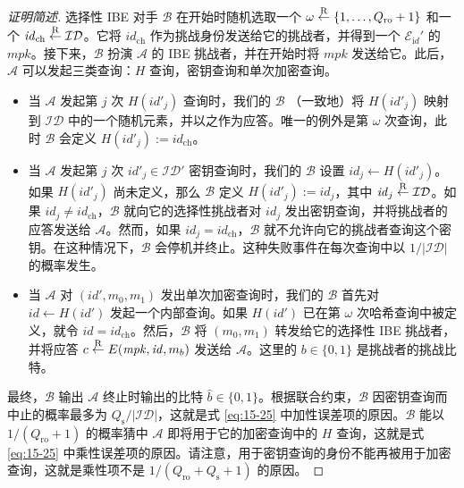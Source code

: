 \begin{proof}[证明简述]
选择性 IBE 对手 $\mathcal{B}$ 在开始时随机选取一个 $\omega\overset{\rm R}\leftarrow\{1,\dots,Q_\mathrm{ro}+1\}$ 和一个 $\mathit{id}_\mathrm{ch}\overset{\rm R}\leftarrow\mathcal{ID}$。它将 $\mathit{id}_\mathrm{ch}$ 作为挑战身份发送给它的挑战者，并得到一个 $\mathcal{E}_{\mathrm{i}d}'$ 的 $\mathit{mpk}$。接下来，$\mathcal{B}$ 扮演 $\mathcal{A}$ 的 IBE 挑战者，并在开始时将 $\mathit{mpk}$ 发送给它。此后，$\mathcal{A}$ 可以发起三类查询：$H$ 查询，密钥查询和单次加密查询。
\begin{itemize}
	\item 当 $\mathcal{A}$ 发起第 $j$ 次 $H(\mathit{id'}_j)$ 查询时，我们的 $\mathcal{B}$ （一致地）将 $H(\mathit{id'}_j)$ 映射到 $\mathcal{ID}$ 中的一个随机元素，并以之作为应答。唯一的例外是第 $\omega$ 次查询，此时 $\mathcal{B}$ 会定义 $H(\mathit{id'}_j):=\mathit{id}_\mathrm{ch}$。
	\item 当 $\mathcal{A}$ 发起第 $j$ 次 $\mathit{id'}_j\in\mathcal{ID}'$ 密钥查询时，我们的 $\mathcal{B}$ 设置 $\mathit{id}_j\leftarrow H(\mathit{id'}_j)$。如果 $H(\mathit{id'}_j)$ 尚未定义，那么 $\mathcal{B}$ 定义 $H(\mathit{id'}_j):=\mathit{id}_j$，其中 $\mathit{id}_j\overset{\rm R}\leftarrow\mathcal{ID}$。如果 $\mathit{id}_j\neq\mathit{id}_\mathrm{ch}$，$\mathcal{B}$ 就向它的选择性挑战者对 $\mathit{id}_j$ 发出密钥查询，并将挑战者的应答发送给 $\mathcal{A}$。然而，如果 $\mathit{id}_j=\mathit{id}_\mathrm{ch}$，$\mathcal{B}$ 就不允许向它的挑战者查询这个密钥。在这种情况下，$\mathcal{B}$ 会停机并终止。这种失败事件在每次查询中以 $1/|\mathcal{ID}|$ 的概率发生。
	\item 当 $\mathcal{A}$ 对 $(\mathit{id'},m_0,m_1)$ 发出单次加密查询时，我们的 $\mathcal{B}$ 首先对 $\mathit{id}\leftarrow H(\mathit{id'})$ 发起一个内部查询。如果 $H(\mathit{id'})$ 已在第 $\omega$ 次哈希查询中被定义，就令 $\mathit{id}=\mathit{id}_\mathrm{ch}$。然后，$\mathcal{B}$ 将 $(m_0,m_1)$ 转发给它的选择性 IBE 挑战者，并将应答 $c\overset{\rm R}\leftarrow E(\mathit{mpk},\mathit{id},m_b)$ 发送给 $\mathcal{A}$。这里的 $b\in\{0,1\}$ 是挑战者的挑战比特。
\end{itemize}
最终，$\mathcal{B}$ 输出 $\mathcal{A}$ 终止时输出的比特 $\hat{b}\in\{0,1\}$。根据联合约束，$\mathcal{B}$ 因密钥查询而中止的概率最多为 $Q_\mathrm{s}/|\mathcal{ID}|$，这就是式 \ref{eq:15-25} 中加性误差项的原因。$\mathcal{B}$ 能以 $1/(Q_\mathrm{ro}+1)$ 的概率猜中 $\mathcal{A}$ 即将用于它的加密查询中的 $H$ 查询，这就是式 \ref{eq:15-25} 中乘性误差项的原因。请注意，用于密钥查询的身份不能再被用于加密查询，这就是乘性项不是 $1/(Q_\mathrm{ro}+Q_\mathrm{s}+1)$ 的原因。
\end{proof}

